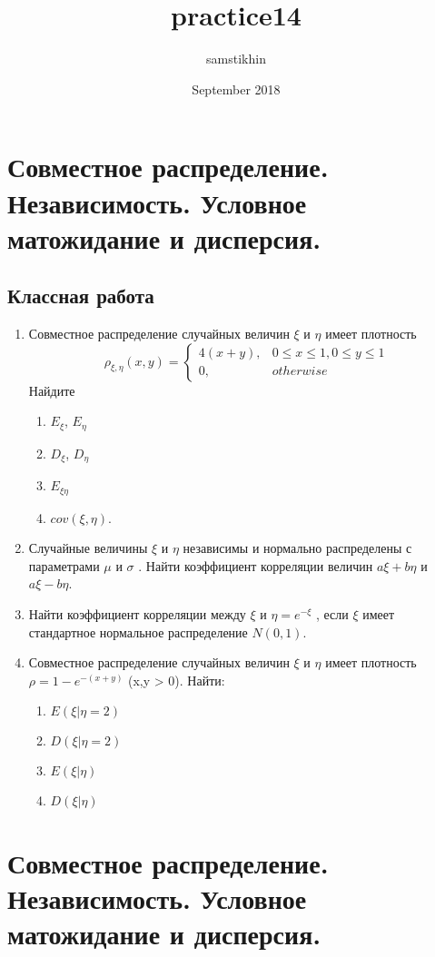 \documentclass[a4paper, 14pt]{extarticle}
\title{practice14}
\author{samstikhin}
\date{September 2018}
\begin{document}
\section*{Совместное распределение. Независимость. Условное матожидание и дисперсия.}
\subsection*{Классная работа}
\begin{enumerate}
\item Совместное распределение случайных величин $\xi$ и $\eta$ имеет плотность
$$\rho_{\xi,\eta}(x,y) =\left\{
	\begin{array}{cc}
	4(x+y), & 0\leq x\leq 1, 0\leq y\leq 1 \\
	0, & otherwise
	\end{array}\right.$$
Найдите 
\begin{enumerate}
\item $E_{\xi}$, $E_{\eta}$
\item $D_{\xi}$, $D_{\eta}$
\item $E_{\xi\eta}$
\item $cov(\xi,\eta)$.
\end{enumerate}
\item Случайные величины $\xi$ и $\eta$ независимы и нормально распределены с параметрами $\mu$ и $\sigma$ . Найти коэффициент корреляции величин
$a\xi + b\eta$ и $a\xi - b\eta$.
\item Найти коэффициент корреляции между $\xi$ и $\eta = e^{-\xi}$ , если 
$\xi$ имеет стандартное нормальное распределение $N(0,1)$.
\item Совместное распределение случайных величин $\xi$ и $\eta$ имеет плотность $\rho = 1-e^{-(x+y)}$ (x,y > 0). 
Найти:
\begin{enumerate}
	\item $E(\xi|\eta = 2)$
	\item $D(\xi|\eta = 2)$
	\item $E(\xi|\eta)$
	\item $D(\xi|\eta)$
\end{enumerate}

\end{enumerate}

\newpage

\section*{Совместное распределение. Независимость. Условное матожидание и дисперсия.}
\end{document}

